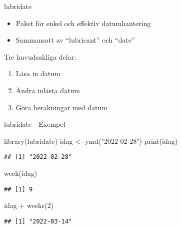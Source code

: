 \documentclass[
  11pt,
  ignorenonframetext,
  handout]{beamer}
\newenvironment{Shaded}{\begin{snugshade}}{\end{snugshade}}
\newcommand{\DecValTok}[1]{\textcolor[rgb]{0.00,0.00,0.81}{#1}}
\newcommand{\FunctionTok}[1]{\textcolor[rgb]{0.00,0.00,0.00}{#1}}
\newcommand{\NormalTok}[1]{#1}
\newcommand{\OtherTok}[1]{\textcolor[rgb]{0.56,0.35,0.01}{#1}}
\newcommand{\SpecialCharTok}[1]{\textcolor[rgb]{0.00,0.00,0.00}{#1}}
\newcommand{\StringTok}[1]{\textcolor[rgb]{0.31,0.60,0.02}{#1}}
\providecommand{\tightlist}{%
  \setlength{\itemsep}{0pt}\setlength{\parskip}{0pt}}
\begin{document}
\begin{frame}{lubridate}
\protect\hypertarget{lubridate}{}
\begin{itemize}
\tightlist
\item
  Paket för enkel och effektiv datumhantering
\item
  Sammansatt av ``lubricant'' och ``date''
\end{itemize}

Tre huvudsakliga delar:

\begin{enumerate}
\tightlist
\item
  Läsa in datum
\item
  Ändra inlästa datum
\item
  Göra beräkningar med datum
\end{enumerate}
\end{frame}

\begin{frame}[fragile]{lubridate - Exempel}
\protect\hypertarget{lubridate---exempel}{}
\begin{Shaded}
\begin{Highlighting}[]
\FunctionTok{library}\NormalTok{(lubridate)}
\NormalTok{idag }\OtherTok{\textless{}{-}} \FunctionTok{ymd}\NormalTok{(}\StringTok{"2022{-}02{-}28"}\NormalTok{)}
\FunctionTok{print}\NormalTok{(idag)}
\end{Highlighting}
\end{Shaded}

\begin{verbatim}
## [1] "2022-02-28"
\end{verbatim}

\begin{Shaded}
\begin{Highlighting}[]
\FunctionTok{week}\NormalTok{(idag)}
\end{Highlighting}
\end{Shaded}

\begin{verbatim}
## [1] 9
\end{verbatim}

\begin{Shaded}
\begin{Highlighting}[]
\NormalTok{idag }\SpecialCharTok{+} \FunctionTok{weeks}\NormalTok{(}\DecValTok{2}\NormalTok{)}
\end{Highlighting}
\end{Shaded}

\begin{verbatim}
## [1] "2022-03-14"
\end{verbatim}
\end{frame}
\end{document}
